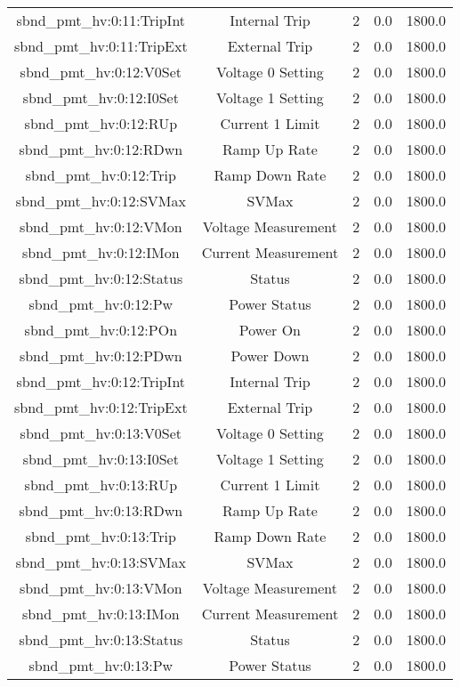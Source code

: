 \begin{center}
\begin{longtable}{c | c c c c }
sbnd\_pmt\_hv:0:11:TripInt & Internal Trip & 2 & 0.0 & 1800.0\\ 
sbnd\_pmt\_hv:0:11:TripExt & External Trip & 2 & 0.0 & 1800.0\\ 
sbnd\_pmt\_hv:0:12:V0Set & Voltage 0 Setting & 2 & 0.0 & 1800.0\\ 
sbnd\_pmt\_hv:0:12:I0Set & Voltage 1 Setting & 2 & 0.0 & 1800.0\\ 
sbnd\_pmt\_hv:0:12:RUp & Current 1 Limit & 2 & 0.0 & 1800.0\\ 
sbnd\_pmt\_hv:0:12:RDwn & Ramp Up Rate & 2 & 0.0 & 1800.0\\ 
sbnd\_pmt\_hv:0:12:Trip & Ramp Down Rate & 2 & 0.0 & 1800.0\\ 
sbnd\_pmt\_hv:0:12:SVMax & SVMax & 2 & 0.0 & 1800.0\\ 
sbnd\_pmt\_hv:0:12:VMon & Voltage Measurement & 2 & 0.0 & 1800.0\\ 
sbnd\_pmt\_hv:0:12:IMon & Current Measurement & 2 & 0.0 & 1800.0\\ 
sbnd\_pmt\_hv:0:12:Status & Status & 2 & 0.0 & 1800.0\\ 
sbnd\_pmt\_hv:0:12:Pw & Power Status & 2 & 0.0 & 1800.0\\ 
sbnd\_pmt\_hv:0:12:POn & Power On & 2 & 0.0 & 1800.0\\ 
sbnd\_pmt\_hv:0:12:PDwn & Power Down & 2 & 0.0 & 1800.0\\ 
sbnd\_pmt\_hv:0:12:TripInt & Internal Trip & 2 & 0.0 & 1800.0\\ 
sbnd\_pmt\_hv:0:12:TripExt & External Trip & 2 & 0.0 & 1800.0\\ 
sbnd\_pmt\_hv:0:13:V0Set & Voltage 0 Setting & 2 & 0.0 & 1800.0\\ 
sbnd\_pmt\_hv:0:13:I0Set & Voltage 1 Setting & 2 & 0.0 & 1800.0\\ 
sbnd\_pmt\_hv:0:13:RUp & Current 1 Limit & 2 & 0.0 & 1800.0\\ 
sbnd\_pmt\_hv:0:13:RDwn & Ramp Up Rate & 2 & 0.0 & 1800.0\\ 
sbnd\_pmt\_hv:0:13:Trip & Ramp Down Rate & 2 & 0.0 & 1800.0\\ 
sbnd\_pmt\_hv:0:13:SVMax & SVMax & 2 & 0.0 & 1800.0\\ 
sbnd\_pmt\_hv:0:13:VMon & Voltage Measurement & 2 & 0.0 & 1800.0\\ 
sbnd\_pmt\_hv:0:13:IMon & Current Measurement & 2 & 0.0 & 1800.0\\ 
sbnd\_pmt\_hv:0:13:Status & Status & 2 & 0.0 & 1800.0\\ 
sbnd\_pmt\_hv:0:13:Pw & Power Status & 2 & 0.0 & 1800.0\\ 

\end{longtable}
\end{center}
